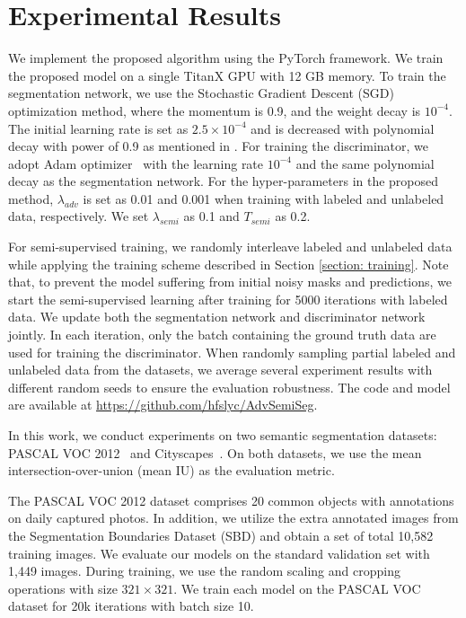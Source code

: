\documentclass{bmvc2k}
\begin{document}
	
	\vspace{-3mm}
	\section{Experimental Results}
	\vspace{-2mm}{\flushleft \bf Implementation details.}
	We implement the proposed algorithm using the PyTorch framework.
	We train the proposed model on a single TitanX GPU with 12 GB memory.
	To train the segmentation network, we use the Stochastic Gradient Descent (SGD) optimization method, where the momentum is 0.9, and the weight decay is $10^{-4}$.
	The initial learning rate is set as $2.5 \times 10^{-4}$ and is decreased with polynomial decay with power of 0.9 as mentioned in \cite{deeplab}.
	For training the discriminator, we adopt Adam optimizer~\cite{kingma2014adam} with the learning rate $10^{-4}$ and the same polynomial decay as the segmentation network.
	For the hyper-parameters in the proposed method, $\lambda_{adv}$ is set as 0.01 and 0.001 when training with labeled and unlabeled data, respectively.
	We set $\lambda_{semi}$ as 0.1 and $T_{semi}$ as 0.2.
	
	For semi-supervised training, we randomly interleave labeled and unlabeled data while applying the training scheme described in Section \ref{section: training}.
	Note that, to prevent the model suffering from initial noisy masks and predictions, we start the semi-supervised learning after training for 5000 iterations with labeled data.
	We update both the segmentation network and discriminator network jointly. In each iteration, only the batch containing the ground truth data are used for training the discriminator.
	When randomly sampling partial labeled and unlabeled data from the datasets, we average several experiment results with different random seeds to ensure the evaluation robustness.
	The code and model are available at \url{https://github.com/hfslyc/AdvSemiSeg}.
	
	\vspace{-2mm}{\flushleft \bf Evaluation datasets and metric.}
	In this work, we conduct experiments on two semantic segmentation datasets: PASCAL VOC 2012~\cite{pascal} and Cityscapes~\cite{cityscapes}. 
	On both datasets, we use the mean intersection-over-union (mean IU) as the evaluation metric.
	
	The PASCAL VOC 2012 dataset comprises 20 common objects with annotations on daily captured photos.
	In addition, we utilize the extra annotated images from the Segmentation Boundaries Dataset (SBD) \cite{sbd} and obtain a set of total 10,582 training images. 
	We evaluate our models on the standard validation set with 1,449 images.
	During training, we use the random scaling and cropping operations with size $321 \times 321$.
	We train each model on the PASCAL VOC dataset for 20k iterations with batch size 10.
	
\end{document}
